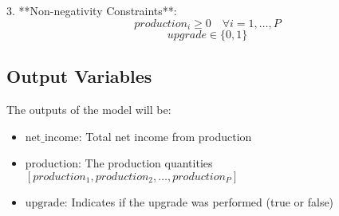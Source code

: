 \documentclass{article}
\begin{document}
3. **Non-negativity Constraints**:
\[
production_i \geq 0 \quad \forall i = 1, \ldots, P
\]
\[
upgrade \in \{0, 1\}
\]

\subsection*{Output Variables}
The outputs of the model will be:
\begin{itemize}
    \item $\text{net\_income}$: Total net income from production
    \item $\text{production}$: The production quantities $[production_1, production_2, \ldots, production_P]$
    \item $\text{upgrade}$: Indicates if the upgrade was performed (true or false)
\end{itemize}
\end{document}
